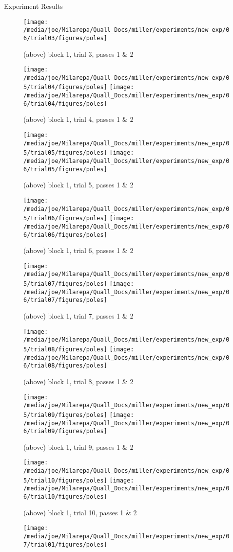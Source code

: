 \documentclass[a4paper,10pt]{report}
\numberwithin{equation}{section}
\begin{document}
{\begin{chapter}
\begin{section}{Experiment Results}
\begin{singlespace}
\begin{figure}[h]
\texttt{[image: /media/joe/Milarepa/Quall\_Docs/miller/experiments/new\_exp/06/trial03/figures/poles]}
\caption{(above) block 1, trial 3, passes 1 \& 2}
\texttt{[image: /media/joe/Milarepa/Quall\_Docs/miller/experiments/new\_exp/05/trial04/figures/poles]}
\texttt{[image: /media/joe/Milarepa/Quall\_Docs/miller/experiments/new\_exp/06/trial04/figures/poles]}
\caption{(above) block 1, trial 4, passes 1 \& 2}
\end{figure}
\begin{figure}[h]
\texttt{[image: /media/joe/Milarepa/Quall\_Docs/miller/experiments/new\_exp/05/trial05/figures/poles]}
\texttt{[image: /media/joe/Milarepa/Quall\_Docs/miller/experiments/new\_exp/06/trial05/figures/poles]}
\caption{(above) block 1, trial 5, passes 1 \& 2}
\texttt{[image: /media/joe/Milarepa/Quall\_Docs/miller/experiments/new\_exp/05/trial06/figures/poles]}
\texttt{[image: /media/joe/Milarepa/Quall\_Docs/miller/experiments/new\_exp/06/trial06/figures/poles]}
\caption{(above) block 1, trial 6, passes 1 \& 2}
\end{figure}
\begin{figure}[h]
\texttt{[image: /media/joe/Milarepa/Quall\_Docs/miller/experiments/new\_exp/05/trial07/figures/poles]}
\texttt{[image: /media/joe/Milarepa/Quall\_Docs/miller/experiments/new\_exp/06/trial07/figures/poles]}
\caption{(above) block 1, trial 7, passes 1 \& 2}
\texttt{[image: /media/joe/Milarepa/Quall\_Docs/miller/experiments/new\_exp/05/trial08/figures/poles]}
\texttt{[image: /media/joe/Milarepa/Quall\_Docs/miller/experiments/new\_exp/06/trial08/figures/poles]}
\caption{(above) block 1, trial 8, passes 1 \& 2}
\end{figure}
\begin{figure}[h]
\texttt{[image: /media/joe/Milarepa/Quall\_Docs/miller/experiments/new\_exp/05/trial09/figures/poles]}
\texttt{[image: /media/joe/Milarepa/Quall\_Docs/miller/experiments/new\_exp/06/trial09/figures/poles]}
\caption{(above) block 1, trial 9, passes 1 \& 2}
\texttt{[image: /media/joe/Milarepa/Quall\_Docs/miller/experiments/new\_exp/05/trial10/figures/poles]}
\texttt{[image: /media/joe/Milarepa/Quall\_Docs/miller/experiments/new\_exp/06/trial10/figures/poles]}
\caption{(above) block 1, trial 10, passes 1 \& 2}
\end{figure}
\begin{figure}[h]
\texttt{[image: /media/joe/Milarepa/Quall\_Docs/miller/experiments/new\_exp/07/trial01/figures/poles]}

\end{figure}
\end{singlespace}
\end{section}
\end{chapter}}
\end{document}
